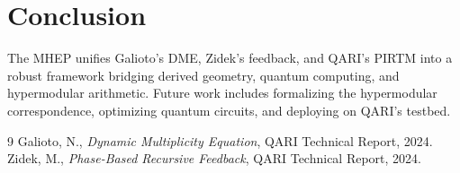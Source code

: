 \documentclass[11pt]{article}
\theoremstyle{plain}
\theoremstyle{definition}
\begin{document}
\section{Conclusion}
The MHEP unifies Galioto’s DME, Zidek’s feedback, and QARI’s PIRTM into a robust framework bridging derived geometry, quantum computing, and hypermodular arithmetic. Future work includes formalizing the hypermodular correspondence, optimizing quantum circuits, and deploying on QARI’s testbed.


\begin{thebibliography}{9}
 Galioto, N., \emph{Dynamic Multiplicity Equation}, QARI Technical Report, 2024.
 Zidek, M., \emph{Phase-Based Recursive Feedback}, QARI Technical Report, 2024.
\end{thebibliography}
\end{document}

